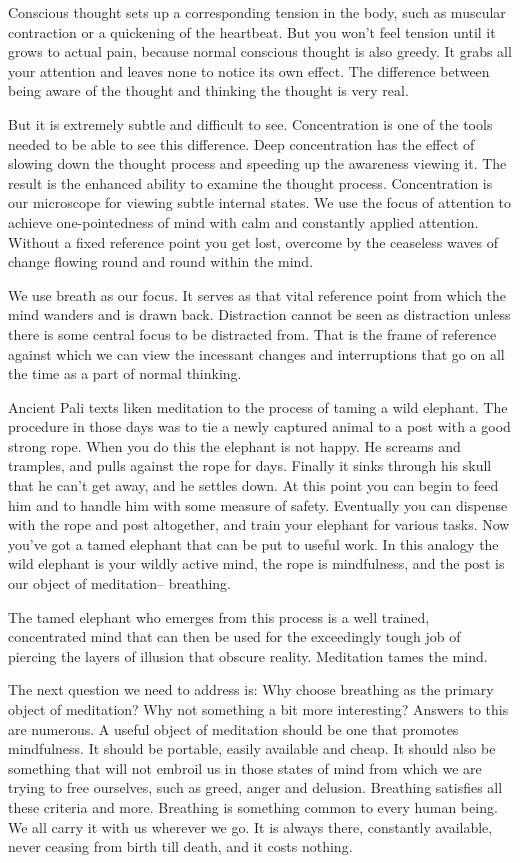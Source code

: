 Conscious thought sets up a corresponding tension in the body, such as muscular
contraction or a quickening of the heartbeat. But you won't feel tension until
it grows to actual pain, because normal conscious thought is also greedy. It
grabs all your attention and leaves none to notice its own effect. The
difference between being aware of the thought and thinking the thought is very
real.

But it is extremely subtle and difficult to see. Concentration is one of the
tools needed to be able to see this difference.
Deep concentration has the effect of slowing down the thought process and speeding up the awareness viewing it. The result is the
enhanced ability to examine the thought process. Concentration is our microscope for viewing subtle internal states. We use the
focus of attention to achieve one-pointedness of mind with calm and constantly applied attention. Without a fixed reference point
you get lost, overcome by the ceaseless waves of change flowing round and round within the mind.

We use breath as our focus. It serves as that vital reference point from which
the mind wanders and is drawn back. Distraction cannot be seen as distraction
unless there is some central focus to be distracted from. That is the frame of
reference against which we can view the incessant changes and interruptions that
go on all the time as a part of normal thinking.

Ancient Pali texts liken meditation to the process of taming a wild elephant.
The procedure in those days was to tie a newly captured animal to a post with a
good strong rope. When you do this the elephant is not happy. He screams and
tramples, and pulls against the rope for days. Finally it sinks through his
skull that he can't get away, and he settles down. At this point you can begin
to feed him and to handle him with some measure of safety. Eventually you can
dispense with the rope and post altogether, and train your elephant for various
tasks. Now you've got a tamed elephant that can be put to useful work. In this
analogy the wild elephant is your wildly active mind, the rope is mindfulness,
and the post is our object of meditation-- breathing.

The tamed elephant who emerges from this process is a well trained, concentrated
mind that can then be used for the exceedingly tough job of piercing the layers
of illusion that obscure reality. Meditation tames the mind.

The next question we need to address is: Why choose breathing as the primary
object of meditation? Why not something a bit more interesting? Answers to this
are numerous. A useful object of meditation should be one that promotes
mindfulness. It should be portable, easily available and cheap. It should also
be something that will not embroil us in those states of mind from which we are
trying to free ourselves, such as greed, anger and delusion. Breathing satisfies
all these criteria and more. Breathing is something common to every human being.
We all carry it with us wherever we go. It is always there, constantly
available, never ceasing from birth till death, and it costs nothing.

